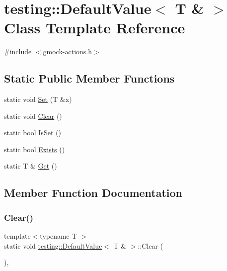 \hypertarget{classtesting_1_1_default_value_3_01_t_01_6_01_4}{}\section{testing\+:\+:Default\+Value$<$ T \& $>$ Class Template Reference}
\label{classtesting_1_1_default_value_3_01_t_01_6_01_4}


{\ttfamily \#include $<$gmock-\/actions.\+h$>$}

\subsection*{Static Public Member Functions}
\begin{DoxyCompactItemize}
\item 
static void \hyperlink{classtesting_1_1_default_value_3_01_t_01_6_01_4_a9863abf3d311ce5007d7e57dfce2f252}{Set} (T \&x)
\item 
static void \hyperlink{classtesting_1_1_default_value_3_01_t_01_6_01_4_a3c8f9f81e591370f9b33798f58ca1a10}{Clear} ()
\item 
static bool \hyperlink{classtesting_1_1_default_value_3_01_t_01_6_01_4_a3e61547c2f0141cc8004385f3a9c817d}{Is\+Set} ()
\item 
static bool \hyperlink{classtesting_1_1_default_value_3_01_t_01_6_01_4_a38420499e17d2fb4146ae6c4265f0d55}{Exists} ()
\item 
static T \& \hyperlink{classtesting_1_1_default_value_3_01_t_01_6_01_4_a1310448dd8c171aecfcbf7c8df5de7bd}{Get} ()
\end{DoxyCompactItemize}


\subsection{Member Function Documentation}
\mbox{\label{classtesting_1_1_default_value_3_01_t_01_6_01_4_a3c8f9f81e591370f9b33798f58ca1a10}} 
\subsubsection{\texorpdfstring{Clear()}{Clear()}}
{\footnotesize\ttfamily template$<$typename T $>$ \\
static void \hyperlink{classtesting_1_1_default_value}{testing\+::\+Default\+Value}$<$ T \& $>$\+::Clear (\begin{DoxyParamCaption}{ }\end{DoxyParamCaption})\hspace{0.3cm}{\ttfamily [inline]}, {\ttfamily [static]}}


